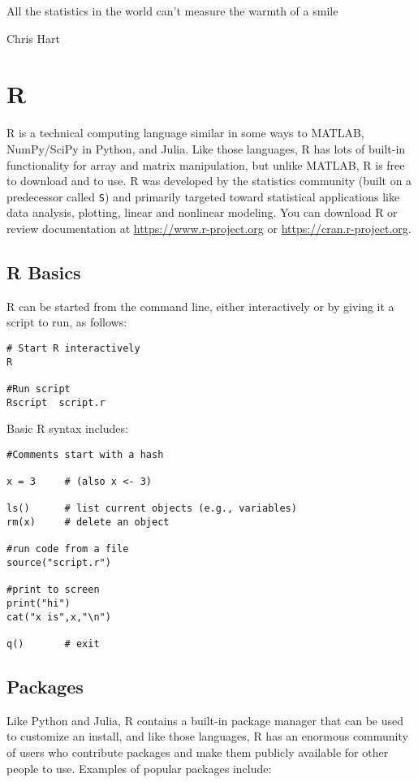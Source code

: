 
\epigraph{All the statistics in the world can't measure the warmth of a smile}{Chris Hart}

\section{R}
R is a technical computing language similar in some ways to MATLAB, NumPy/SciPy in Python, and Julia. Like those languages, R has lots of built-in functionality for array and matrix manipulation, but unlike MATLAB, R is free to download and to use.  R was developed by the statistics community (built on a predecessor called \texttt{S}) and primarily targeted toward statistical applications like data analysis, plotting, linear and nonlinear modeling. You can download R or review documentation at \url{https://www.r-project.org} or \url{https://cran.r-project.org}.

\subsection{R Basics}
R can be started from the command line, either interactively or by giving it a script to run, as follows:
\begin{verbatim}
# Start R interactively
R

#Run script
Rscript  script.r 
\end{verbatim}

Basic R syntax includes:
\begin{verbatim}
#Comments start with a hash

x = 3     # (also x <- 3)

ls()      # list current objects (e.g., variables)
rm(x)     # delete an object

#run code from a file
source("script.r")

#print to screen
print("hi")
cat("x is",x,"\n")

q()       # exit
\end{verbatim}


\subsection{Packages}
Like Python and Julia, R contains a built-in package manager that can be used to customize an install, and like those languages, R has an enormous community of users who contribute packages and make them publicly available for other people to use. Examples of popular packages include: 
	
